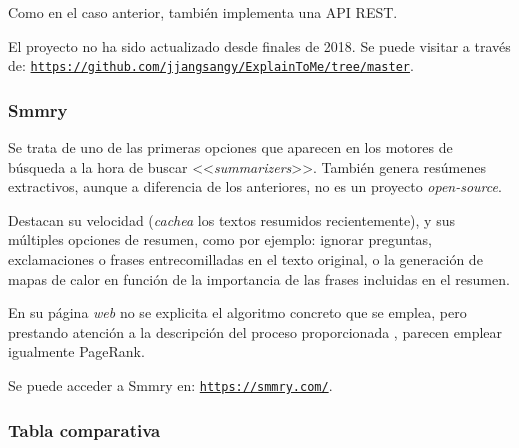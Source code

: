 Como en el caso anterior, también implementa una API REST.

El proyecto no ha sido actualizado desde finales de 2018. Se puede visitar a través de:
\href{https://github.com/jjangsangy/ExplainToMe/tree/master}{\texttt{{\small https://github.com/jjangsangy/ExplainToMe/tree/master}}}.


\bigskip
\subsubsection{Smmry}

Se trata de uno de las primeras opciones que aparecen en los motores de búsqueda a la hora de buscar <<\emph{summarizers}>>. También genera resúmenes extractivos, aunque a diferencia de los anteriores, no es un proyecto \emph{open-source}.

Destacan su velocidad (\emph{cachea} los textos resumidos recientemente), y sus múltiples opciones de resumen, como por ejemplo: ignorar preguntas, exclamaciones o frases entrecomilladas en el texto original, o la generación de mapas de calor en función de la importancia de las frases incluidas en el resumen.

En su página \emph{web} no se explicita el algoritmo concreto que se emplea, pero prestando atención a la descripción del proceso proporcionada \cite{smmry}, parecen emplear igualmente PageRank.

Se puede acceder a Smmry en:
\href{https://smmry.com/}{\texttt{{\small https://smmry.com/}}}.

\bigskip
\subsubsection{Tabla comparativa}

